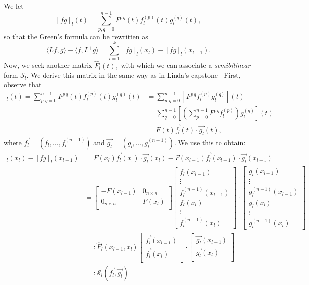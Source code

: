 \documentclass[11pt,reqno,oneside,a4paper]{article}
\theoremstyle{plain} %
\theoremstyle{definition}
\theoremstyle{remark}
\begin{document}
We let 
\[ 
[fg]_l(t) = \sum_{p,q=0}^{n-1}F^{p\,q}(t)f_l^{(p)}(t)g_l^{(q)}(t),
\]
so that the Green's formula can be rewritten as 
\[ \langle Lf,g\rangle - \langle f,L^+ g\rangle = \sum_{l=1}^{k} [fg]_l(x_l) - [fg]_l(x_{l-1}).\]
Now, we seek another matrix $\widehat{F}_l(t),$ with which we can associate a \emph{semibilinear} form $\mathcal{S}_l$. We derive this matrix in the same way as in Linda's capstone \cite{linfan}. First, observe that 
\begin{align*}
[fg]_l(t) = \sum_{p,q=0}^{n-1}F^{p\,q}(t) f_l^{(p)}(t)g_l^{(q)}(t) &= \sum_{p,q=0}^{n-1}\left[F^{p\,q} f_l^{(p)} g_l^{(q)}\right](t)  \\
&= \sum_{q=0}^{n-1}\left[ \left(\sum_{p=0}^{n-1} F^{p\,q} f_l^{(p)}\right) g_l^{(q)}\right](t) \\
&= F(t) \vec{f_l}(t) \cdot \vec{g_l}(t), 
\end{align*}
where $\vec{f_l} = (f_l, \ldots, f_l^{(n-1)})$ and $\vec{g_l} = (g_l, \ldots, g_l^{(n-1)}).$ We use this to obtain:
\begin{align*}
[fg]_l(x_l) - [fg]_l(x_{l-1}) &= F(x_l) \vec{f_l}(x_l) \cdot \vec{g_l}(x_l) - F(x_{l-1}) \vec{f_l}(x_{l-1}) \cdot \vec{g_l}(x_{l-1}) \\
&= \begin{bmatrix}
- F(x_{l-1}) & 0_{n\times n} \\
0_{n\times n} &  F(x_{l}) \\
\end{bmatrix}
\begin{bmatrix}
f_l(x_{l-1})  \\
\vdots \\
f_l^{(n-1)}(x_{l-1}) \\
f_l(x_{l})  \\
\vdots \\
f_l^{(n-1)}(x_{l}) 
\end{bmatrix}
\cdot
\begin{bmatrix}
g_l(x_{l-1})  \\
\vdots \\
g_l^{(n-1)}(x_{l-1}) \\
g_l(x_{l})  \\
\vdots \\
g_l^{(n-1)}(x_{l}) 
\end{bmatrix} \\
&=: \widehat{F}_l(x_{l-1}, x_l)  
\begin{bmatrix}
\vec{f_l}(x_{l-1})  \\
\vec{f_l}(x_{l})  \\
\end{bmatrix}
\cdot
\begin{bmatrix}
\vec{g_l}(x_{l-1})  \\
\vec{g_l}(x_{l})  \\
\end{bmatrix} \\
&=: \mathcal{S}_l (\vec{f_l}, \vec{g_l})
\end{align*}
\end{document}
